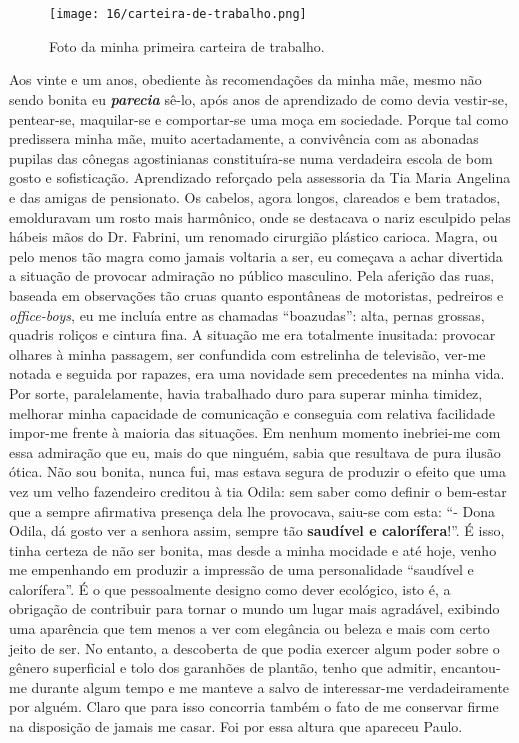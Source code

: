 \chapter{}

\begin{figure}
\centering
\texttt{[image: 16/carteira-de-trabalho.png]}
\caption{Foto da minha primeira carteira de trabalho.}
\end{figure}

Aos vinte e um anos, obediente às recomendações da minha mãe, mesmo não sendo bonita eu \textbf{\textit{parecia}} sê-lo, após anos de aprendizado de como devia vestir-se, pentear-se, maquilar-se e comportar-se uma moça em sociedade.
Porque tal como predissera minha mãe, muito acertadamente, a convivência com as abonadas pupilas das cônegas agostinianas constituíra-se numa verdadeira escola de bom gosto e sofisticação.
Aprendizado reforçado pela assessoria da Tia Maria Angelina e das amigas de pensionato.
Os cabelos, agora longos, clareados e bem tratados, emolduravam um rosto mais harmônico, onde se destacava o nariz esculpido pelas hábeis mãos do Dr.
Fabrini, um renomado cirurgião plástico carioca.
Magra, ou pelo menos tão magra como jamais voltaria a ser, eu começava a achar divertida a situação de provocar admiração no público masculino.
Pela aferição das ruas, baseada em observações tão cruas quanto espontâneas de motoristas, pedreiros e \textit{office-boys}, eu me incluía entre as chamadas “boazudas”: alta, pernas grossas, quadris roliços e cintura fina.
A situação me era totalmente inusitada: provocar olhares à minha passagem, ser confundida com estrelinha de televisão, ver-me notada e seguida por rapazes, era uma novidade sem precedentes na minha vida.
Por sorte, paralelamente, havia trabalhado duro para superar minha timidez, melhorar minha capacidade de comunicação e conseguia com relativa facilidade impor-me frente à maioria das situações.
Em nenhum momento inebriei-me com essa admiração que eu, mais do que ninguém, sabia que resultava de pura ilusão ótica.
Não sou bonita, nunca fui, mas estava segura de produzir o efeito que uma vez um velho fazendeiro creditou à tia Odila: sem saber como definir o bem-estar que a sempre afirmativa presença dela lhe provocava, saiu-se com esta: “- Dona Odila, dá gosto ver a senhora assim, sempre tão \textbf{saudível e calorífera}!”.
É isso, tinha certeza de não ser bonita, mas desde a minha mocidade e até hoje, venho me empenhando em produzir a impressão de uma personalidade “saudível e calorífera”.
É o que pessoalmente designo como dever ecológico, isto é, a obrigação de contribuir para tornar o mundo um lugar mais agradável, exibindo uma aparência que tem menos a ver com elegância ou beleza e mais com certo jeito de ser.
No entanto, a descoberta de que podia exercer algum poder sobre o gênero superficial e tolo dos garanhões de plantão, tenho que admitir, encantou-me durante algum tempo e me manteve a salvo de interessar-me verdadeiramente por alguém.
Claro que para isso concorria também o fato de me conservar firme na disposição de jamais me casar.
Foi por essa altura que apareceu Paulo.

